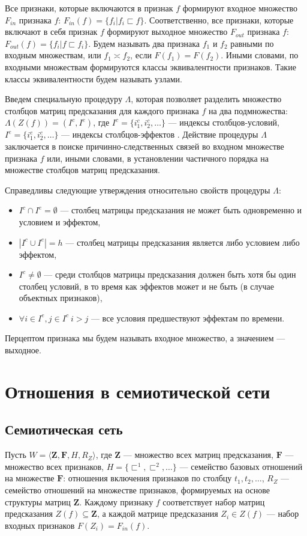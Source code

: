 \documentclass[12pt]{scrartcl}
\begin{document}
	Все признаки, которые включаются в признак $f$ формируют входное множество $F_{in}$ признака $f$: $F_{in}(f)=\{f_i|f_i\sqsubset f\}$. Соответственно, все признаки, которые включают в себя признак $f$ формируют выходное множество $F_{out}$ признака $f$: $F_{out}(f)=\{f_i|f\sqsubset f_i\}$. Будем называть два признака $f_1$ и $f_2$ равными по входным множествам, или $f_1 \asymp f_2$, если $F(f_1)=F(f_2)$. Иными словами, по входными множествам формируются классы эквивалентности признаков. Такие классы эквивалентности будем называть узлами.
	
	Введем специальную процедуру $\Lambda$, которая позволяет разделить множество столбцов матриц предсказания для каждого признака $f$ на два подмножества: $\Lambda(Z(f))=(I^c,I^e)$, где $I^c=\{i_1^c,i_2^c,\dots\}$ --- индексы столбцов-условий, $I^e=\{i_1^e,i_2^e,\dots\}$ --- индексы столбцов-эффектов . Действие процедуры $\Lambda$ заключается в поиске причинно-следственных связей во входном множестве признака $f$ или, иными словами, в установлении частичного порядка на множестве столбцов матриц предсказания. 
	
	Справедливы следующие утверждения относительно свойств процедуры $\Lambda$:
	\begin{itemize}
		\item $I^c\cap I^e=\emptyset$ --- столбец матрицы предсказания не может быть одновременно и условием и эффектом,
		\item $|I^c\cup I^e|=h$ --- столбец матрицы предсказания является либо условием либо эффектом,
		\item $I^c\not = \emptyset$ --- среди столбцов матрицы предсказания должен быть хотя бы один столбец условий, в то время как эффектов может и не быть (в случае объектных признаков),
		\item $\forall i\in I^e, j\in I^c\ i>j$ --- все условия предшествуют эффектам по времени.
	\end{itemize}
	
	Перцептом признака мы будем называть входное множество, а значением --- выходное.
	
	\section{Отношения в семиотической сети}
	\subsection{Семиотическая сеть}
	Пусть $W=\langle \boldsymbol Z,\boldsymbol F,H,R_Z\rangle$, где $\boldsymbol Z$ --- множество всех матриц предсказания, $\boldsymbol F$ --- множество всех признаков, $H=\{\sqsubset^1, \sqsubset^2, \dots\}$ --- семейство базовых отношений на множестве $\boldsymbol F$: отношения включения признаков по столбцу $t_1,t_2,\dots$, $R_Z$ --- семейство отношений на множестве признаков, формируемых на основе структуры матриц $\boldsymbol Z$. Каждому признаку $f$ соответствует набор матриц предсказания $Z(f)\subseteq \boldsymbol Z$, а каждой матрице предсказания $Z_i\in Z(f)$ --- набор входных признаков $F(Z_i)=F_{in}(f)$. 
	
\end{document}
